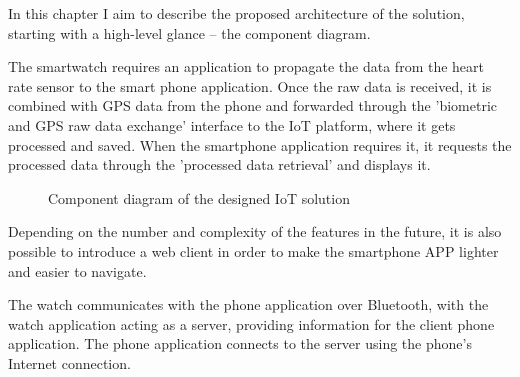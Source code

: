\linebreak
In this chapter I aim to describe the proposed architecture of the solution, starting with a high-level glance -- the component diagram.

The smartwatch requires an application to propagate the data from the heart rate sensor to the smart phone application.
Once the raw data is received, it is combined with GPS data from the phone and forwarded through the 'biometric and GPS raw data exchange' interface to the IoT platform, where it gets processed and saved.
When the smartphone application requires it, it requests the processed data through the 'processed data retrieval' and displays it.

\begin{figure}[h]
    \caption{Component diagram of the designed IoT solution}
\end{figure}

Depending on the number and complexity of the features in the future, it is also possible to introduce a web client in order to make the smartphone APP lighter and easier to navigate.

The watch communicates with the phone application over Bluetooth, with the watch application acting as a server, providing information for the client phone application.
The phone application connects to the server using the phone's Internet connection.
